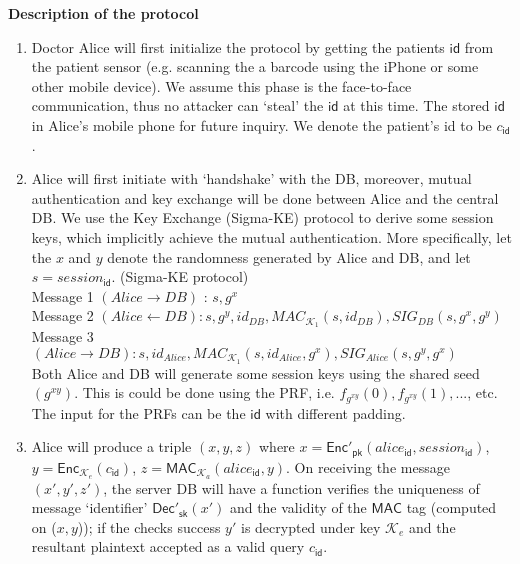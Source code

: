 \documentclass[11pt]{article}
\newcommand{\class}[1]{{\ensuremath{\mathsf{#1}}}}
\newcommand{\enc}{\class{Enc}}
\newcommand{\dec}{\class{Dec}}
\newcommand{\id}{\class{id}}
\newcommand{\K}{\mathcal{K}}
\newcommand{\mac}{\class{MAC}}
\newcommand{\pk}{\class{pk}}
\newcommand{\sk}{\class{sk}}
\newcommand{\xnote}[1]{}
\newcommand{\xnote}[1]{\marginpar{\textcolor{red}{\textbf{!!!}}}\textcolor{blue}{\sf #1 --X.M.}}
\begin{document}
\textbf{Description of the protocol}
\begin{enumerate}
\item Doctor Alice will first initialize the protocol by getting the patients $\id$ from the patient sensor (e.g. scanning the a barcode using the iPhone or some other mobile device). We assume this phase is the face-to-face communication, thus no attacker can `steal' the $\id$ at this time. The stored $\id$ in Alice's mobile phone for future inquiry. We denote the patient's id to be $c_\id$. 

\item Alice will first initiate with `handshake' with the DB, moreover, mutual authentication and key exchange will be done between Alice and the central DB. We use the Key Exchange (Sigma-KE) protocol to derive some session keys, which implicitly achieve the mutual authentication. More specifically, let the $x$ and $y$ denote the randomness generated by Alice and DB, and let $s = session_{\id}$.
(Sigma-KE protocol)\\
Message 1 $(Alice \to DB)$ : $s, g^x$\\
Message 2 $(Alice \leftarrow DB) : s, g^y, id_{DB}, MAC_{\K_1}(s, id_{DB}), SIG_{DB}(s, g^x, g^y)$\\
Message 3 $(Alice \to DB) : s, id_{Alice}, MAC_{\K_1}(s, id_{Alice} , g^x), SIG_{Alice} (s, g^y, g^x)$\\

Both Alice and DB will generate some session keys using the shared seed $(g^{xy})$. This is could be done using the PRF, i.e. $f_{g^{xy}}(0), f_{g^{xy}}(1), ...$, etc. The input for the PRFs can be the $\id$ with different padding.

\item Alice will produce a triple $(x, y, z)$ where $x = \enc'_{\pk}(alice_\id, session_\id)$, $y = \enc_{\K_e}(c_\id)$, $z = \mac_{\K_a}(alice_\id, y)$. On receiving the message $(x', y', z')$, the server DB will have a function verifies the uniqueness of message `identifier' $\dec'_\sk(x')$ and the validity of the $\mac$ tag (computed on ($x, y$));  if the checks success $y'$ is decrypted under key $\K_e$ and the resultant plaintext accepted as a valid query $c_\id$.

\xnote{As addressed  in \cite{BonehCOP04} (used Public key encryption) or \cite{SongWP00} (Symmetric Key Encryption), to protect the search query from Alice, we may consider, in the future, to hide the query $c_\id$.}



\end{enumerate}
\end{document}
